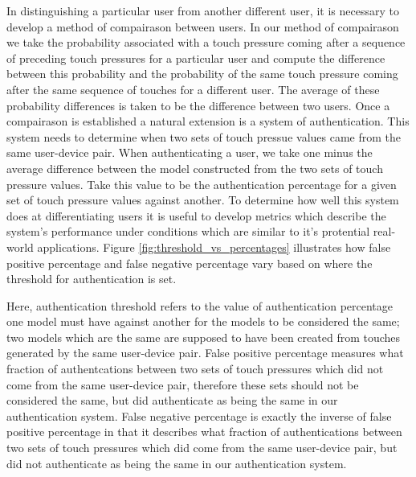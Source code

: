 \documentclass{acm_proc_article-sp}
\begin{document}
In distinguishing a particular user from another different user, it is necessary to develop a method of compairason between users. In our method of compairason we take the probability associated with a touch pressure coming after a sequence of preceding touch pressures for a particular user and compute the difference between this probability and the probability of the same touch pressure coming after the same sequence of touches for a different user. The average of these probability differences is taken to be the difference between two users.
%
Once a compairason is established a natural extension is a system of authentication. This system needs to determine when two sets of touch pressue values came from the same user-device pair. When authenticating a user, we take one minus the average difference between the model constructed from the two sets of touch pressure values. Take this value to be the authentication percentage for a given set of touch pressure values against another.
%
To determine how well this system does at differentiating users it is useful to develop metrics which describe the system's performance under conditions which are similar to it's protential real-world applications. Figure \ref{fig:threshold_vs_percentages} illustrates how false positive percentage and false negative percentage vary based on where the threshold for authentication is set. 

Here, authentication threshold refers to the value of authentication percentage one model must have against another for the models to be considered the same; two models which are the same are supposed to have been created from touches generated by the same user-device pair.
False positive percentage measures what fraction of authentcations between two sets of touch pressures which did not come from the same user-device pair, therefore these sets should not be considered the same, but did authenticate as being the same in our authentication system.
False negative percentage is exactly the inverse of false positive percentage in that it describes what fraction of authentications between two sets of touch pressures which did come from the same user-device pair, but did not authenticate as being the same in our authentication system.
\end{document}
